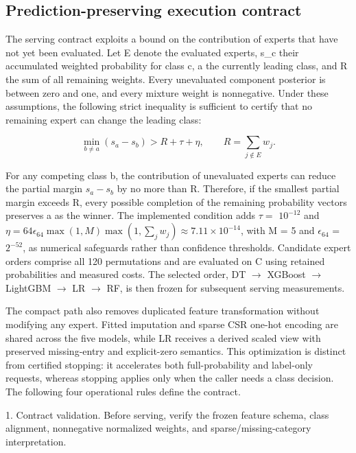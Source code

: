 \documentclass[final,3p,10pt,nopreprintline]{elsarticle}
\begin{document}
\subsection{Prediction-preserving execution contract}

The serving contract exploits a bound on the contribution of experts that have not yet been evaluated. Let E denote the evaluated experts, s\_c their accumulated weighted probability for class c, a the currently leading class, and R the sum of all remaining weights. Every unevaluated component posterior is between zero and one, and every mixture weight is nonnegative. Under these assumptions, the following strict inequality is sufficient to certify that no remaining expert can change the leading class:

\begin{equation}\min_{b\ne a}(s_a-s_b)>R+\tau+\eta,\qquad R=\sum_{j\notin E} w_j.\label{eq:certificate}\end{equation}

For any competing class b, the contribution of unevaluated experts can reduce the partial margin \(s_a-s_b\) by no more than R. Therefore, if the smallest partial margin exceeds R, every possible completion of the remaining probability vectors preserves a as the winner. The implemented condition adds \(\tau =\) \(10^{-12}\) and \(\eta=64\epsilon_{64}\max(1,M)\max(1,\sum_jw_j)\approx7.11\times10^{-14}\), with M = 5 and \(\epsilon_{64}\) = \(2^{-52}\), as numerical safeguards rather than confidence thresholds. Candidate expert orders comprise all 120 permutations and are evaluated on C using retained probabilities and measured costs. The selected order, DT \(\rightarrow\) XGBoost \(\rightarrow\) LightGBM \(\rightarrow\) LR \(\rightarrow\) RF, is then frozen for subsequent serving measurements.

The compact path also removes duplicated feature transformation without modifying any expert. Fitted imputation and sparse CSR one-hot encoding are shared across the five models, while LR receives a derived scaled view with preserved missing-entry and explicit-zero semantics. This optimization is distinct from certified stopping: it accelerates both full-probability and label-only requests, whereas stopping applies only when the caller needs a class decision. The following four operational rules define the contract.

1. Contract validation. Before serving, verify the frozen feature schema, class alignment, nonnegative normalized weights, and sparse/missing-category interpretation.
\end{document}
